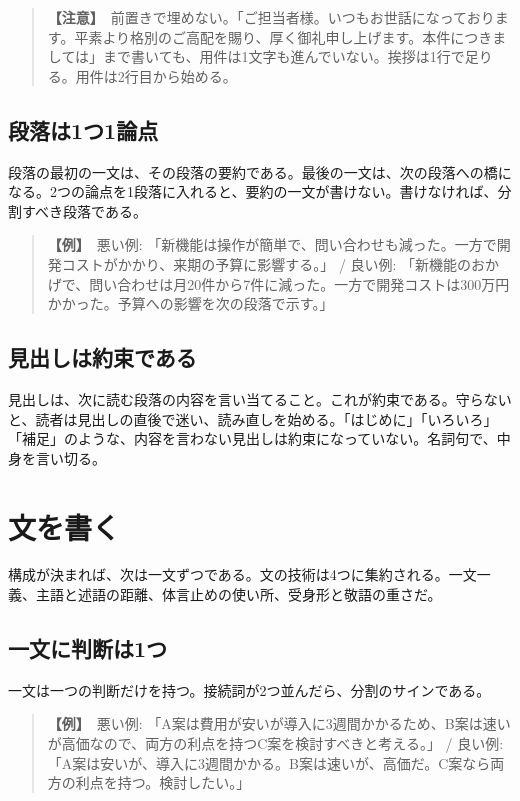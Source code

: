 \documentclass{article}
\begin{document}
\begin{quote}
\textbf{【注意】}\ 前置きで埋めない。「ご担当者様。いつもお世話になっております。平素より格別のご高配を賜り、厚く御礼申し上げます。本件につきましては」まで書いても、用件は1文字も進んでいない。挨拶は1行で足りる。用件は2行目から始める。
\end{quote}

\subsection{段落は1つ1論点}

段落の最初の一文は、その段落の要約である。最後の一文は、次の段落への橋になる。2つの論点を1段落に入れると、要約の一文が書けない。書けなければ、分割すべき段落である。

\begin{quote}
\textbf{【例】}\ 悪い例: 「新機能は操作が簡単で、問い合わせも減った。一方で開発コストがかかり、来期の予算に影響する。」 / 良い例: 「新機能のおかげで、問い合わせは月20件から7件に減った。一方で開発コストは300万円かかった。予算への影響を次の段落で示す。」
\end{quote}

\subsection{見出しは約束である}

見出しは、次に読む段落の内容を言い当てること。これが約束である。守らないと、読者は見出しの直後で迷い、読み直しを始める。「はじめに」「いろいろ」「補足」のような、内容を言わない見出しは約束になっていない。名詞句で、中身を言い切る。

\section{文を書く}

構成が決まれば、次は一文ずつである。文の技術は4つに集約される。一文一義、主語と述語の距離、体言止めの使い所、受身形と敬語の重さだ。

\subsection{一文に判断は1つ}

一文は一つの判断だけを持つ。接続詞が2つ並んだら、分割のサインである。

\begin{quote}
\textbf{【例】}\ 悪い例: 「A案は費用が安いが導入に3週間かかるため、B案は速いが高価なので、両方の利点を持つC案を検討すべきと考える。」 / 良い例: 「A案は安いが、導入に3週間かかる。B案は速いが、高価だ。C案なら両方の利点を持つ。検討したい。」
\end{quote}
\end{document}
